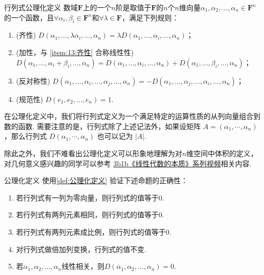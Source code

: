 \begin{definition}{行列式}{公理化定义} 
    数域$\mathbf{F}$上的一个$n$阶是取值于$\mathbf{F}$的$n$个$n$维向量$\alpha_1,\alpha_2,\ldots,\alpha_n \in \mathbf{F}^n$的一个函数，且$\forall \alpha_i,\beta_i \in \mathbf{F}^n$和$\forall \lambda \in \mathbf{F}$，满足下列规则：
    \begin{enumerate}
        \item \label{item:13:齐性}
              (齐性) $D(\alpha_1,\ldots,\lambda\alpha_i,\ldots,\alpha_n)=\lambda D(\alpha_1,\ldots,\alpha_i,\ldots,\alpha_n)$；

        \item \label{item:13:加性}
              (加性，与 \ref*{item:13:齐性} 合称线性性) \\
              $D(\alpha_1,\ldots,\alpha_i+\beta_i,\ldots,\alpha_n)=D(\alpha_1,\ldots,\alpha_i,\ldots,\alpha_n)+D(\alpha_1,\ldots,\beta_i,\ldots,\alpha_n)$；

        \item \label{item:13:反对称性}
              (反对称性) $D(\alpha_1,\ldots,\alpha_i,\ldots,\alpha_j,\ldots,\alpha_n)=-D(\alpha_1,\ldots,\alpha_j,\ldots,\alpha_i,\ldots,\alpha_n)$；

        \item \label{item:13:规范性}
              (规范性) $D(e_1,e_2,\ldots,e_n)=1$.
    \end{enumerate}
\end{definition}
在公理化定义中，我们将行列式定义为一个满足特定的运算性质的从列向量组合到数的函数. 需要注意的是，行列式除了上述记法外，如果设矩阵 $A = (\alpha_1,\cdots,\alpha_n)$，那么行列式 $D(\alpha_1,\cdots,\alpha_n)$ 也可以记为 $|A|$.

除此之外，我们不难看出公理化定义可以形象地理解为对$n$维空间中体积的定义，对几何意义感兴趣的同学可以参考 \href{https://b23.tv/BV1ys411472E}{3b1b《线性代数的本质》系列视频}相关内容.
\begin{example}{}{公理化定义}
    使用\autoref{def:公理化定义} 验证下述命题的正确性：
    \begin{enumerate}
        \item 若行列式有一列为零向量，则行列式的值等于0.

        \item 若行列式有两列元素相同，则行列式的值等于0.

        \item 若行列式有两列元素成比例，则行列式的值等于0.

        \item 对行列式做倍加列变换，行列式的值不变.

        \item 若$\alpha_1,\alpha_2,\ldots,\alpha_n$线性相关，则$D(\alpha_1,\alpha_2,\ldots,\alpha_n)=0$.
    \end{enumerate}
\end{example}

